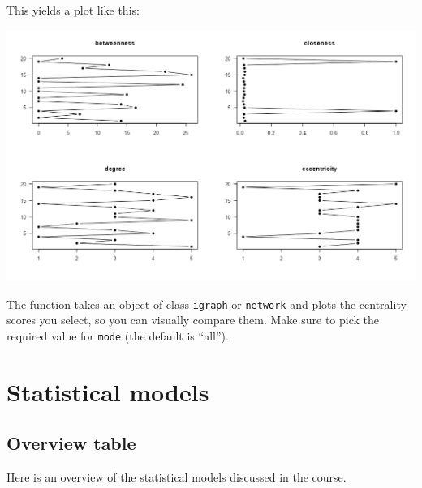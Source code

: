 \documentclass[
]{article}
\begin{document}
This yields a plot like this:

\includegraphics[width=14.28in]{plot_centralities}

The function takes an object of class \texttt{igraph} or
\texttt{network} and plots the centrality scores you select, so you can
visually compare them. Make sure to pick the required value for
\texttt{mode} (the default is ``all'').

\hypertarget{statistical-models}{%
\section{Statistical models}\label{statistical-models}}

\hypertarget{overview-table}{%
\subsection{Overview table}\label{overview-table}}

Here is an overview of the statistical models discussed in the course.
\end{document}
